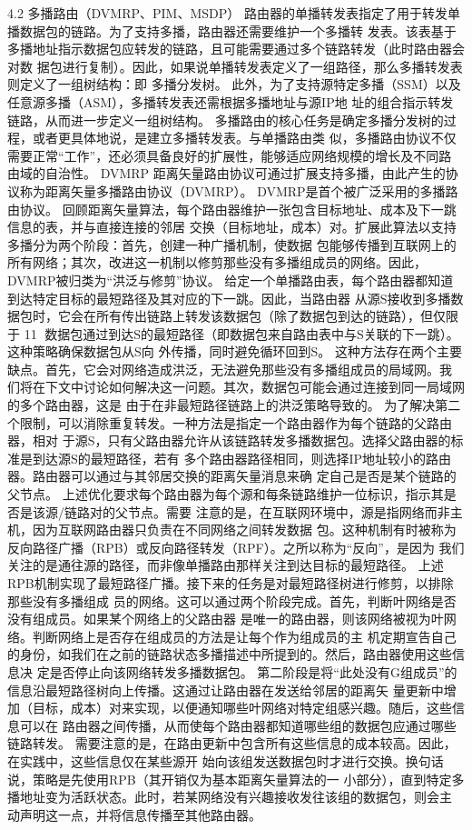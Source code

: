 4.2 多播路由（DVMRP、PIM、MSDP）
路由器的单播转发表指定了用于转发单播数据包的链路。为了支持多播，路由器还需要维护一个多播转
发表。该表基于多播地址指示数据包应转发的链路，且可能需要通过多个链路转发（此时路由器会对数
据包进行复制）。因此，如果说单播转发表定义了一组路径，那么多播转发表则定义了一组树结构：即
多播分发树。
此外，为了支持源特定多播（SSM）以及任意源多播（ASM），多播转发表还需根据多播地址与源IP地
址的组合指示转发链路，从而进一步定义一组树结构。
多播路由的核心任务是确定多播分发树的过程，或者更具体地说，是建立多播转发表。与单播路由类
似，多播路由协议不仅需要正常“工作”，还必须具备良好的扩展性，能够适应网络规模的增长及不同路
由域的自治性。
DVMRP
距离矢量路由协议可通过扩展支持多播，由此产生的协议称为距离矢量多播路由协议（DVMRP）。
DVMRP是首个被广泛采用的多播路由协议。
回顾距离矢量算法，每个路由器维护一张包含目标地址、成本及下一跳信息的表，并与直接连接的邻居
交换（目标地址，成本）对。扩展此算法以支持多播分为两个阶段：首先，创建一种广播机制，使数据
包能够传播到互联网上的所有网络；其次，改进这一机制以修剪那些没有多播组成员的网络。因此，
DVMRP被归类为“洪泛与修剪”协议。
给定一个单播路由表，每个路由器都知道到达特定目标的最短路径及其对应的下一跳。因此，当路由器
从源S接收到多播数据包时，它会在所有传出链路上转发该数据包（除了数据包到达的链路），但仅限于
                                                 11
数据包通过到达S的最短路径（即数据包来自路由表中与S关联的下一跳）。这种策略确保数据包从S向
外传播，同时避免循环回到S。
这种方法存在两个主要缺点。首先，它会对网络造成洪泛，无法避免那些没有多播组成员的局域网。我
们将在下文中讨论如何解决这一问题。其次，数据包可能会通过连接到同一局域网的多个路由器，这是
由于在非最短路径链路上的洪泛策略导致的。
为了解决第二个限制，可以消除重复转发。一种方法是指定一个路由器作为每个链路的父路由器，相对
于源S，只有父路由器允许从该链路转发多播数据包。选择父路由器的标准是到达源S的最短路径，若有
多个路由器路径相同，则选择IP地址较小的路由器。路由器可以通过与其邻居交换的距离矢量消息来确
定自己是否是某个链路的父节点。
上述优化要求每个路由器为每个源和每条链路维护一位标识，指示其是否是该源/链路对的父节点。需要
注意的是，在互联网环境中，源是指网络而非主机，因为互联网路由器只负责在不同网络之间转发数据
包。这种机制有时被称为反向路径广播（RPB）或反向路径转发（RPF）。之所以称为“反向”，是因为
我们关注的是通往源的路径，而非像单播路由那样关注到达目标的最短路径。
上述RPB机制实现了最短路径广播。接下来的任务是对最短路径树进行修剪，以排除那些没有多播组成
员的网络。这可以通过两个阶段完成。首先，判断叶网络是否没有组成员。如果某个网络上的父路由器
是唯一的路由器，则该网络被视为叶网络。判断网络上是否存在组成员的方法是让每个作为组成员的主
机定期宣告自己的身份，如我们在之前的链路状态多播描述中所提到的。然后，路由器使用这些信息决
定是否停止向该网络转发多播数据包。
第二阶段是将“此处没有G组成员”的信息沿最短路径树向上传播。这通过让路由器在发送给邻居的距离矢
量更新中增加（目标，成本）对来实现，以便通知哪些叶网络对特定组感兴趣。随后，这些信息可以在
路由器之间传播，从而使每个路由器都知道哪些组的数据包应通过哪些链路转发。
需要注意的是，在路由更新中包含所有这些信息的成本较高。因此，在实践中，这些信息仅在某些源开
始向该组发送数据包时才进行交换。换句话说，策略是先使用RPB（其开销仅为基本距离矢量算法的一
小部分），直到特定多播地址变为活跃状态。此时，若某网络没有兴趣接收发往该组的数据包，则会主
动声明这一点，并将信息传播至其他路由器。




